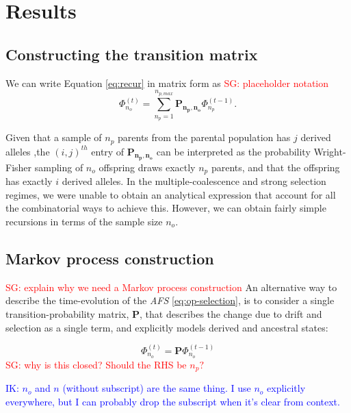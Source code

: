 \documentclass[review]{elsarticle}
\newcommand{\afs}[2]{\Phi_{#1}^{(#2)}}
\newcommand{\sgcomment}[1]{\textcolor{red}{SG: #1}}
\newcommand{\ikcomment}[1]{\textcolor{blue}{IK: #1}}
\begin{document}
\section{Results}
\label{sec:results}

\subsection{Constructing the transition matrix}

We can write Equation \eqref{eq:recur} in matrix form as \sgcomment{placeholder notation}
 \begin{equation}
\label{eq:recur}
 \afs{n_o}{t} = \sum_{n_p=1}^{n_{p,max}} \mathbf{P_{n_p,n_o}} \afs{n_p}{t-1}.
\end{equation}

Given that a sample of $n_p$ parents from the parental population has $j$ derived alleles ,the $(i, j)^{th}$ entry of $\mathbf{P_{n_p,n_o}} $ can be interpreted as the probability Wright-Fisher sampling of $n_o$ offspring draws exactly $n_p$ parents, and that the offspring has exactly $i$ derived alleles. 
In the multiple-coalescence and strong selection regimes, we were unable to obtain an analytical expression
 that account for all the combinatorial ways to achieve this. However, we can obtain fairly simple recursions
 in terms of the sample size $n_o.$




\subsection{Markov process construction}
\label{subsec:markov}

\sgcomment{explain why we need a Markov process construction}
An alternative way to describe the time-evolution of the \textit{AFS} \eqref{eq:op-selection}, is to
consider a single transition-probability matrix, $\mathbf{P}$, that describes the change due to
drift and selection as a single term, and explicitly models derived and ancestral states:

\begin{equation}
  \label{eq:app:time-evolution}
  \afs{n_o}{t} = \mathbf{P} \afs{n_o}{t-1}
\end{equation}
\sgcomment{why is this closed? Should the RHS be $n_p?$}

\ikcomment{$n_o$ and $n$ (without subscript) are the same thing. I use $n_o$ explicitly everywhere,
  but I can probably drop the subscript when it's clear from context.}
\end{document}
